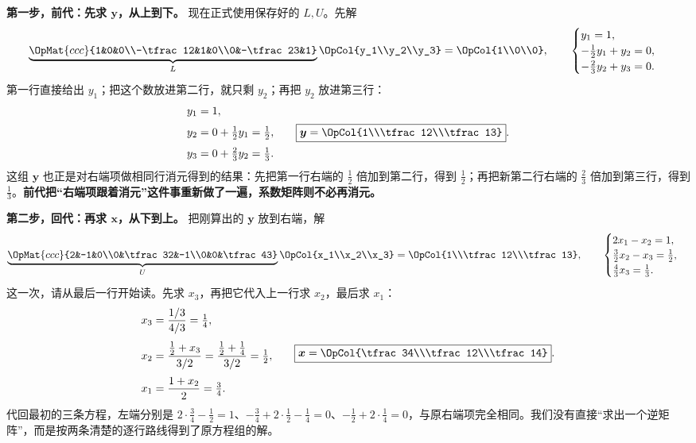 \documentclass[a4paper,12pt,twoside,openany,fontset=none]{ctexbook}
\numberwithin{equation}{chapter}
\begin{document}
\par\medskip\noindent\textbf{第一步，前代：先求 $\boldsymbol y$，从上到下。}
现在正式使用保存好的 $L,U$。先解
\[
 \underbrace{\OpMat{ccc}{1&0&0\\-\tfrac12&1&0\\0&-\tfrac23&1}}_{L}
 \OpCol{y_1\\y_2\\y_3}=\OpCol{1\\0\\0},
 \qquad
 \begin{cases}
 y_1=1,\\
 -\tfrac12y_1+y_2=0,\\
 -\tfrac23y_2+y_3=0.
 \end{cases}
\]
第一行直接给出 $y_1$；把这个数放进第二行，就只剩 $y_2$；再把 $y_2$ 放进第三行：
\[
 \begin{aligned}
 y_1&=1,\\[3pt]
 y_2&=0+\tfrac12y_1=\tfrac12,\\[3pt]
 y_3&=0+\tfrac23y_2=\tfrac13.
 \end{aligned}
 \qquad
 \boxed{\boldsymbol y=\OpCol{1\\\tfrac12\\\tfrac13}}.
\]
这组 $\boldsymbol y$ 也正是对右端项做相同行消元得到的结果：先把第一行右端的 $\tfrac12$ 倍加到第二行，得到 $\tfrac12$；再把新第二行右端的 $\tfrac23$ 倍加到第三行，得到 $\tfrac13$。\textbf{前代把“右端项跟着消元”这件事重新做了一遍，系数矩阵则不必再消元。}

\par\medskip\noindent\textbf{第二步，回代：再求 $\boldsymbol x$，从下到上。}
把刚算出的 $\boldsymbol y$ 放到右端，解
\[
 \underbrace{\OpMat{ccc}{2&-1&0\\0&\tfrac32&-1\\0&0&\tfrac43}}_{U}
 \OpCol{x_1\\x_2\\x_3}=\OpCol{1\\\tfrac12\\\tfrac13},
 \qquad
 \begin{cases}
 2x_1-x_2=1,\\
 \tfrac32x_2-x_3=\tfrac12,\\
 \tfrac43x_3=\tfrac13.
 \end{cases}
\]
这一次，请从最后一行开始读。先求 $x_3$，再把它代入上一行求 $x_2$，最后求 $x_1$：
\[
 \begin{aligned}
 x_3&=\frac{1/3}{4/3}=\tfrac14,\\[3pt]
 x_2&=\frac{\tfrac12+x_3}{3/2}
     =\frac{\tfrac12+\tfrac14}{3/2}=\tfrac12,\\[3pt]
 x_1&=\frac{1+x_2}{2}=\tfrac34.
 \end{aligned}
 \qquad
 \boxed{\boldsymbol x=\OpCol{\tfrac34\\\tfrac12\\\tfrac14}}.
\]
代回最初的三条方程，左端分别是 $2\cdot\tfrac34-\tfrac12=1$、$-\tfrac34+2\cdot\tfrac12-\tfrac14=0$、$-\tfrac12+2\cdot\tfrac14=0$，与原右端项完全相同。我们没有直接“求出一个逆矩阵”，而是按两条清楚的逐行路线得到了原方程组的解。
\end{document}
